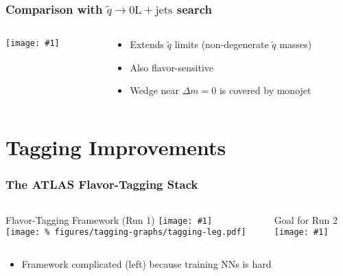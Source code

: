 \documentclass[usenames,dvipsnames]{beamer}
\newcommand{\widegraphic}[1]{\texttt{[image: \#1]}}
\begin{document}
\begin{frame}
  \frametitle{Comparison with $\tilde{q} \to \mathrm{0L} + \text{jets}$ search}
  \begin{columns}
    \begin{column}{0.6\textwidth}
      \widegraphic{int/figures/limit_tree/full_exclusion/exclusion_inclusive.pdf}
    \end{column}
    \begin{column}{0.4\textwidth}
      \begin{itemize}
      \item Extends $\tilde{q}$ limits (non-degenerate $\tilde{q}$ masses)
      \item Also flavor-sensitive
      \item Wedge near $\Delta m = 0$ is covered by monojet
      \end{itemize}
    \end{column}
  \end{columns}
\end{frame}


\section{Tagging Improvements}


\begin{frame}
  \frametitle{The ATLAS Flavor-Tagging Stack}
  \begin{columns}
    \begin{column}{0.6\textwidth}
      \begin{center}
        Flavor-Tagging Framework (Run 1)
        \widegraphic{%
figures/tagging-graphs/tagging-full-nogaia.pdf} \\
        \texttt{[image: \%
figures/tagging-graphs/tagging-leg.pdf]}
      \end{center}
    \end{column}
    \vline
    \begin{column}{0.4\textwidth}
      \begin{center}
        Goal for Run 2 \\[0.1cm]
        \widegraphic{%
figures/tagging-graphs/tagging-gaia-future.pdf}
      \end{center}
    \end{column}
  \end{columns}
  \begin{itemize}
  \item Framework complicated (left) because training NNs is hard
  \end{itemize}
\end{frame}
\end{document}

